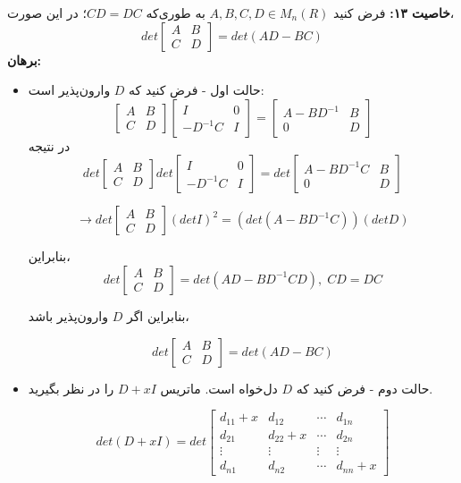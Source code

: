 \textbf{خاصیت ۱۳:}
فرض کنید
$ A,B,C,D \in M_n(R) $
به طوری‌که $CD=DC$؛ در این صورت،
$$det \begin{bmatrix}
	A & B \\
	C & D
\end{bmatrix} = det(AD-BC) $$
\textbf{برهان:}
\begin{itemize}
	\item
	حالت اول - فرض کنید که $D$ وارون‌پذیر است:
	$$ \begin{bmatrix}
	A & B \\
	C & D
	\end{bmatrix}\begin{bmatrix}
	I & 0 \\
	-D^{-1}C & I
	\end{bmatrix}=\begin{bmatrix}
	A-BD^{-1} & B \\
	0 & D
	\end{bmatrix} $$
	در نتیجه
	$$ det \begin{bmatrix}
	A & B \\
	C & D
	\end{bmatrix} det\begin{bmatrix}
	I & 0 \\
	-D^{-1}C & I
	\end{bmatrix}=det \begin{bmatrix}
	A-BD^{-1}C & B \\
	0 & D
	\end{bmatrix} $$
	
	$$ \to det \begin{bmatrix}
	A & B \\
	C & D
	\end{bmatrix} (detI)^2 = (det(A-BD^{-1}C))(detD) $$
	
	بنابراین،
	$$ det \begin{bmatrix}
	A & B \\
	C & D
	\end{bmatrix} = det(AD-BD^{-1}CD), \; CD = DC$$
	
		بنابراین اگر $D$ وارون‌پذیر باشد،
	
	$$ det \begin{bmatrix}
	A & B \\
	C & D
	\end{bmatrix} = det(AD-BC) $$
	
\item
حالت دوم - فرض کنید که $D$ دل‌خواه است. ماتریس $D+xI$ را در نظر بگیرید.

$$ det(D+xI) = det \begin{bmatrix}
d_{11} + x & d_{12} & \cdots & d_{1n} \\
d_{21} & d_{22} + x & \cdots & d_{2n} \\
\vdots & \vdots & \vdots & \vdots \\
d_{n1} & d_{n2} & \cdots & d_{nn} + x
\end{bmatrix} $$


\end{itemize}
